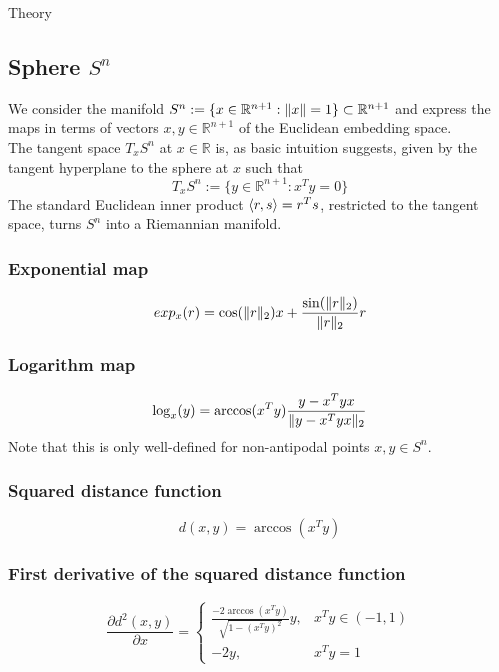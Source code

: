 \begin{chapter}{Theory}

\subsection{Sphere $S^n$} %
\label{sub:Sphere}
We consider the manifold $S^n:=\lbrace x\in\mathbb{R}^{n+1}: \| x \|=1\rbrace\subset\mathbb{R}^{n+1}$ and express the maps in terms of vectors $x,y\in\mathbb{R}^{n+1}$ of the Euclidean 
embedding space.\\
The tangent space $T_xS^n$ at $x\in\mathbb{R}$ is, as basic intuition suggests, given by the tangent hyperplane to the sphere at $x$ such that
\begin{equation}
    \label{eq:sntangentspace}
    T_xS^n:=\lbrace y\in\mathbb{R}^{n+1}: x^Ty=0 \rbrace
\end{equation}
The standard Euclidean inner product $\left\langle r,s \right\rangle=r^Ts$, restricted to the tangent space, turns $S^n$ into a Riemannian manifold.

\subsubsection{Exponential map} %
\label{ssub:ExponentialS2}
\begin{equation}
    exp_x(r)= \cos(\| r \|_2)x + \frac{\sin(\| r \|_{2})}{\| r \|_{2}}r 
\end{equation}

\subsubsection{Logarithm map} %
\label{ssub:LogarithmS2}
\begin{equation}
    \log_x(y)= \arccos(x^Ty)\frac{y-x^Tyx}{\| y-x^Tyx \|_2}
\end{equation}
Note that this is only well-defined for non-antipodal points $x,y\in S^n$.

\subsubsection{Squared distance function} %
\label{ssub:SquareddistanceS2}
\begin{equation}
    d(x,y)=\arccos(x^Ty)
\end{equation}

\subsubsection{First derivative of the squared distance function} %
\label{ssub:FirstDerS2}
\begin{equation}
    \frac{\partial d^2(x,y)}{\partial x}=\begin{cases}
	\frac{-2\arccos(x^Ty)}{\sqrt{1-(x^Ty)^{2}}}y, & x^Ty\in (-1,1)\\
	-2y, & x^Ty=1
    \end{cases}
\end{equation}


\end{chapter}

